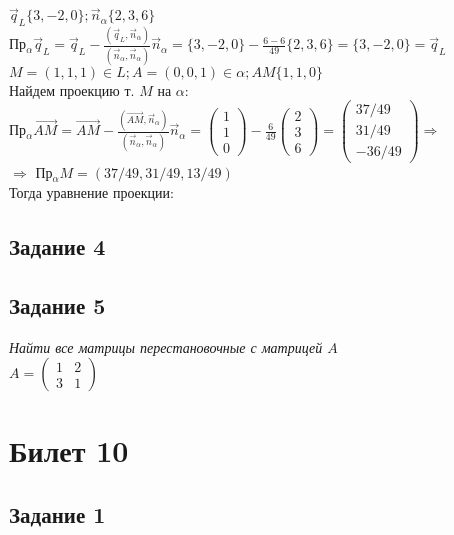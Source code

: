 \documentclass{article}
\theoremstyle{definition}
\theoremstyle{plain}
\begin{document}
$\vec{q}_{L}\{3, -2, 0\}; \vec{n}_{\alpha}\{2, 3, 6\}$\\
Пр$_{\alpha}\vec{q}_{L} = \vec{q}_{L} - \frac{(\vec{q}_{L}, \vec{n}_{\alpha})}{(\vec{n}_{\alpha}, \vec{n}_{\alpha})} \vec{n}_{\alpha} = %
\{3, -2, 0\} - \frac{6 - 6}{49}\{2, 3, 6\} = \{3, -2, 0\} = \vec{q}_{L}$\\
$M = (1, 1, 1) \in L; A = (0, 0, 1) \in \alpha; AM\{1, 1, 0\}$\\
Найдем проекцию т. $M$ на $\alpha$:\\
Пр$_{\alpha}\vec{AM} = \vec{AM} - \frac{(\vec{AM}, \vec{n}_{\alpha})}{(\vec{n}_{\alpha}, \vec{n}_{\alpha})}\vec{n}_{\alpha} = %
\begin{pmatrix}
  1\\ 1\\ 0
\end{pmatrix}
-
\frac{6}{49}
\begin{pmatrix}
  2\\ 3\\ 6
\end{pmatrix}
=
\begin{pmatrix}
  37/49\\ 31/49\\ -36/49
\end{pmatrix}
\Rightarrow$\\
$\Rightarrow$ Пр$_{\alpha}M = (37/49, 31/49, 13/49)$\\
Тогда уравнение проекции: 

\subsection{Задание 4}
\subsection{Задание 5}
\emph{Найти все матрицы перестановочные с матрицей $A$}\\
$A =
\begin{pmatrix}
  1 & 2\\
  3 & 1
\end{pmatrix}$


\section{Билет 10}
\subsection{Задание 1}
\end{document}
